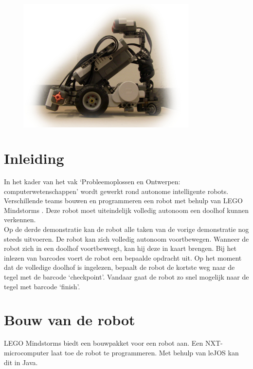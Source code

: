 \documentclass[tt3]{penoverslag}
\begin{document}
\begin{figure}[!hb]
\begin{flushright}
    \includegraphics[width=0.8\textwidth]{robotFP}
    \label{fig:robotFP}
\end{flushright}
\end{figure}

\newpage

\tableofcontents
\listoftables
\listoffigures
\thispagestyle{empty}

\newpage 

\section{Inleiding} %
\label{ssec:inl}
In het kader van het vak `Probleemoplossen en Ontwerpen: computerwetenschappen' wordt gewerkt rond autonome intelligente robots. Verschillende teams bouwen en programmeren een robot met behulp van LEGO Mindstorms \cite{mindstorms}. Deze robot moet uiteindelijk volledig autonoom een doolhof kunnen verkennen.\\

Op de derde demonstratie kan de robot alle taken van de vorige demonstratie nog steeds uitvoeren. De robot kan zich volledig autonoom voortbewegen. Wanneer de robot zich in een doolhof voortbeweegt, kan hij deze in kaart brengen. Bij het inlezen van barcodes voert de robot een bepaalde opdracht uit. Op het moment dat de volledige doolhof is ingelezen, bepaalt de robot de kortste weg naar de tegel met de barcode `checkpoint'. Vandaar gaat de robot zo snel mogelijk naar de tegel met barcode `finish'.

\section{Bouw van de robot} %
\label{sec:bouw}
LEGO Mindstorms \cite{mindstorms} biedt een bouwpakket voor een robot aan. Een NXT-microcomputer laat toe de robot te programmeren. Met behulp van leJOS \cite{leJOS} kan dit in Java.
\end{document}
